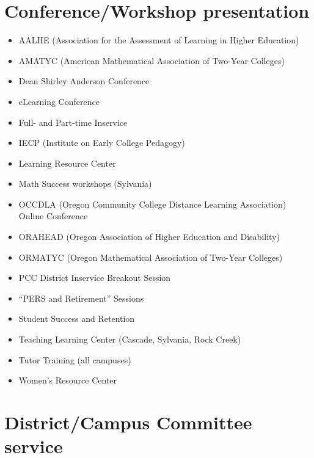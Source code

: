 \section*{Conference/Workshop presentation}

\begin{itemize}[label={}]
\item AALHE (Association for the Assessment of Learning in Higher Education)
\item AMATYC (American Mathematical Association of Two-Year Colleges)
\item Dean Shirley Anderson Conference
\item eLearning Conference
\item Full- and Part-time Inservice
\item IECP (Institute on Early College Pedagogy)
\item Learning Resource Center
\item Math Success workshops (Sylvania)
\item OCCDLA (Oregon Community College Distance Learning Association) Online Conference
\item ORAHEAD (Oregon Association of Higher Education and Disability)
\item ORMATYC (Oregon Mathematical Association of Two-Year Colleges)
\item PCC District Inservice Breakout Session
\item ``PERS and Retirement'' Sessions
\item Student Success and Retention
\item Teaching Learning Center (Cascade, Sylvania, Rock Creek)
\item Tutor Training (all campuses)
\item Women's Resource Center
\end{itemize}

\section*{District/Campus Committee service}

